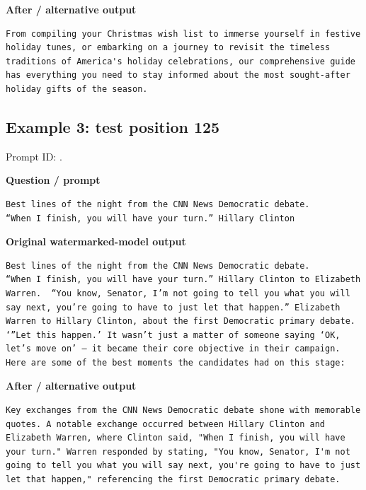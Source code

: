 \textbf{After / alternative output}

\begin{Verbatim}
From compiling your Christmas wish list to immerse yourself in festive holiday tunes, or embarking on a journey to revisit the timeless traditions of America's holiday celebrations, our comprehensive guide has everything you need to stay informed about the most sought-after holiday gifts of the season.
\end{Verbatim}

\subsection{Example 3: test position
125}\label{record-docs-watermarking-qualitative-paper-kgw-vanilla-md-example-3-test-position-125}

Prompt ID:
\texttt{}.

\textbf{Question / prompt}

\begin{Verbatim}
Best lines of the night from the CNN News Democratic debate.
“When I finish, you will have your turn.” Hillary Clinton
\end{Verbatim}

\textbf{Original watermarked-model output}

\begin{Verbatim}
Best lines of the night from the CNN News Democratic debate.
“When I finish, you will have your turn.” Hillary Clinton to Elizabeth Warren.  “You know, Senator, I’m not going to tell you what you will say next, you’re going to have to just let that happen.” Elizabeth Warren to Hillary Clinton, about the first Democratic primary debate.  ‘”Let this happen.’ It wasn’t just a matter of someone saying ‘OK, let’s move on’ – it became their core objective in their campaign. Here are some of the best moments the candidates had on this stage:
\end{Verbatim}

\textbf{After / alternative output}

\begin{Verbatim}
Key exchanges from the CNN News Democratic debate shone with memorable quotes. A notable exchange occurred between Hillary Clinton and Elizabeth Warren, where Clinton said, "When I finish, you will have your turn." Warren responded by stating, "You know, Senator, I'm not going to tell you what you will say next, you're going to have to just let that happen," referencing the first Democratic primary debate.
\end{Verbatim}

